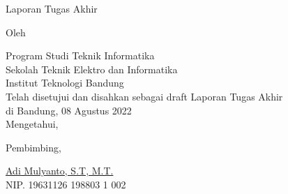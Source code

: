 \clearpage
\pagestyle{empty}

\begin{center}
    \smallskip

    \Large \bfseries \MakeUppercase{\thetitle}
    \vfill

    \Large Laporan Tugas Akhir
    \vfill

    \large Oleh

    \Large \theauthor

    \large Program Studi Teknik Informatika \\

    \normalsize \normalfont
    Sekolah Teknik Elektro dan Informatika \\
    Institut Teknologi Bandung \\

    \vfill
    \normalsize \normalfont
    Telah disetujui dan disahkan sebagai draft Laporan Tugas Akhir \\
    di Bandung, 08 Agustus 2022 \\
    Mengetahui,

    \vspace{0.5cm}
    Pembimbing,

    \vfill
    \underline{Adi Mulyanto, S.T, M.T.} \\
    NIP. 19631126 198803 1 002

\end{center}
\clearpage
